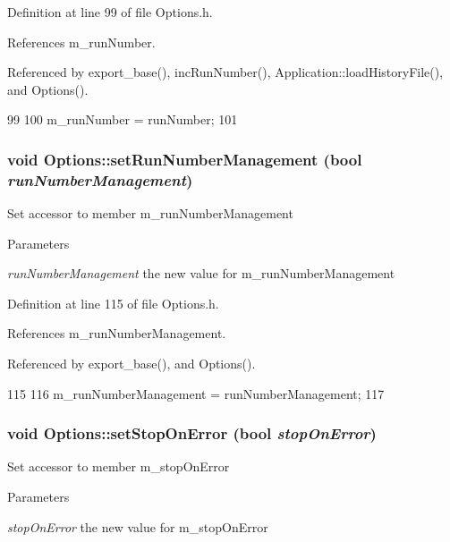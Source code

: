 Definition at line 99 of file Options.h.

References m\_\-runNumber.

Referenced by export\_\-base(), incRunNumber(), Application::loadHistoryFile(), and Options().


\begin{DoxyCode}
99                                                     {
100                 m_runNumber = runNumber;
101         }
\end{DoxyCode}
\hypertarget{classOptions_a7bf3fb2833021f8900eb105b0a9c02c5}{
\subsubsection[{setRunNumberManagement}]{\setlength{\rightskip}{0pt plus 5cm}void Options::setRunNumberManagement (bool {\em runNumberManagement})}}
\label{classOptions_a7bf3fb2833021f8900eb105b0a9c02c5}
Set accessor to member m\_\-runNumberManagement 
\begin{DoxyParams}{Parameters}
\item[{\em runNumberManagement}]the new value for m\_\-runNumberManagement \end{DoxyParams}


Definition at line 115 of file Options.h.

References m\_\-runNumberManagement.

Referenced by export\_\-base(), and Options().


\begin{DoxyCode}
115                                                                {
116                 m_runNumberManagement = runNumberManagement;
117         }
\end{DoxyCode}
\hypertarget{classOptions_a0d362af154c7d2e30a7bf340eb061fa5}{
\subsubsection[{setStopOnError}]{\setlength{\rightskip}{0pt plus 5cm}void Options::setStopOnError (bool {\em stopOnError})}}
\label{classOptions_a0d362af154c7d2e30a7bf340eb061fa5}
Set accessor to member m\_\-stopOnError 
\begin{DoxyParams}{Parameters}
\item[{\em stopOnError}]the new value for m\_\-stopOnError \end{DoxyParams}


